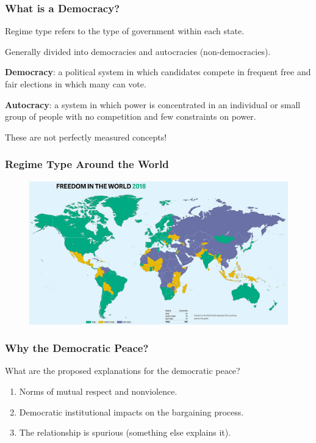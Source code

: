 \documentclass[handout]{beamer}
\begin{document}
\begin{frame} 
\frametitle{\LARGE{What is a Democracy?}}
\begin{itemize}
	\large{
		\item Regime type refers to the type of government within each state. \pause 
		\item Generally divided into democracies and autocracies (non-democracies). \pause 
		\item \textbf{Democracy}: a political system in which candidates compete in frequent free and fair elections in which many can vote. \pause 
		\item \textbf{Autocracy}: a system in which power is concentrated in an individual or small group of people with no competition and few constraints on power. \pause 
		\item These are not perfectly measured concepts!
	}
\end{itemize}
\end{frame}

\begin{frame} 
\frametitle{\LARGE{Regime Type Around the World}}
\begin{figure}[ht!]
	\centering
	\includegraphics[width=\textwidth,height=0.8\textheight,keepaspectratio]{./democ.jpg}
\end{figure}
\end{frame}

\begin{frame} 
\frametitle{\LARGE{Why the Democratic Peace?}}
What are the proposed explanations for the democratic peace? \pause
\begin{enumerate}
		\item Norms of mutual respect and nonviolence. \pause 
		\item Democratic institutional impacts on the bargaining process. \pause
		\item The relationship is spurious (something else explains it).
\end{enumerate}
\end{frame}
\end{document}

